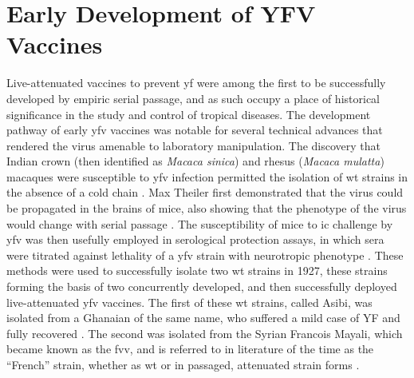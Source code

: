 \section{Early Development of YFV Vaccines}
Live-attenuated vaccines to prevent \gls{yf} were among the first to be successfully developed by empiric serial passage, and as such occupy a place of historical significance in the study and control of tropical diseases. The development pathway of early \gls{yfv} vaccines was notable for several technical advances that rendered the virus amenable to laboratory manipulation. The discovery that Indian crown (then identified as \emph{Macaca sinica}) and rhesus (\emph{Macaca mulatta}) macaques were susceptible to \gls{yfv} infection permitted the isolation of \gls{wt} strains in the absence of a cold chain \parencite{Stokes:1928uh}. Max Theiler first demonstrated that the virus could be propagated in the brains of mice, also showing that the phenotype of the virus would change with serial passage \parencite{Theiler:1930gy}. The susceptibility of mice to \gls{ic} challenge by \gls{yfv} was then usefully employed in serological protection assays, in which sera were titrated against lethality of a \gls{yfv} strain with neurotropic phenotype \parencite{Theiler:1931tp}. These methods were used to successfully isolate two \gls{wt} strains in 1927, these strains forming the basis of two concurrently developed, and then successfully deployed live-attenuated \gls{yfv} vaccines. The first of these \gls{wt} strains, called Asibi, was isolated from a Ghanaian of the same name, who suffered a mild case of YF and fully recovered \parencite{Stokes:1928uh}. The second was isolated from the Syrian Francois Mayali, which became known as the \gls{fvv}, and is referred to in literature of the time as the “French” strain, whether as \gls{wt} or in passaged, attenuated strain forms \parencite{Sellards:1928wb}.

